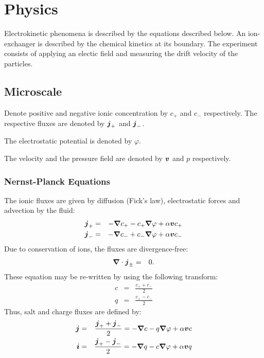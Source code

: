 \section{Physics}
Electrokinetic phenomena is described by the equations described below.
An ion-exchanger is described by the chemical kinetics at its boundary.
The experiment consists of applying an electic field and measuring the drift velocity of the particles.

\subsection{Microscale}
Denote positive and negative ionic concentration by $c_+$ and $c_-$ respectively.
The respective fluxes are denoted by $\boldsymbol{j}_+$ and $\boldsymbol{j}_-$.

The electrostatic potential is denoted by $\varphi$. 

The velocity and the pressure field are denoted by $\boldsymbol{v}$ and $p$ respectively.

\subsubsection{Nernst-Planck Equations}
The ionic fluxes are given by diffusion (Fick's law), electrostatic forces and advection by the fluid:
\begin{eqnarray}
\boldsymbol{j}_+ &=& -\boldsymbol{\nabla} c_+ - c_+ \boldsymbol{\nabla} \varphi + \alpha \boldsymbol{v} c_+ \\
\boldsymbol{j}_- &=& -\boldsymbol{\nabla} c_- + c_- \boldsymbol{\nabla} \varphi + \alpha \boldsymbol{v} c_-
\end{eqnarray}
Due to conservation of ions, the fluxes are divergence-free:
\begin{eqnarray}
\boldsymbol{\nabla} \cdot \boldsymbol{j}_\pm &=& 0.
\end{eqnarray}
These equation may be re-written by using the following transform:
\begin{eqnarray}
c &=& \frac{c_+ + c_-}{2}\\
q &=& \frac{c_+ - c_-}{2}
\end{eqnarray}
Thus, salt and charge fluxes are defined by:
\begin{eqnarray}
\boldsymbol{j} &=& \frac{\boldsymbol{j}_+ + \boldsymbol{j}_-}{2} = -\boldsymbol{\nabla} c - q \boldsymbol{\nabla} \varphi + \alpha \boldsymbol{v} c \\
\boldsymbol{i} &=& \frac{\boldsymbol{j}_+ - \boldsymbol{j}_-}{2} = -\boldsymbol{\nabla} q - c \boldsymbol{\nabla} \varphi + \alpha \boldsymbol{v} q
\end{eqnarray}

